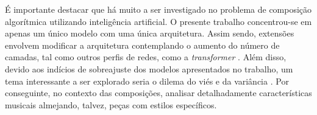 \documentclass[twoside]{automatextcc}
\begin{document}
É importante destacar que há muito a ser investigado no problema de composição algorítmica utilizando inteligência artificial. O presente trabalho concentrou-se em apenas um único modelo com uma única arquitetura. Assim sendo, extensões envolvem modificar a arquitetura contemplando o aumento do número de camadas, tal como outros perfis de redes, como a \textit{transformer} \citep{vaswani2017}. Além disso, devido aos indícios de sobreajuste dos modelos apresentados no trabalho, um tema interessante a ser explorado seria o dilema do viés e da variância \citep{geman_1992}. Por conseguinte, no contexto das composições, analisar detalhadamente características musicais almejando, talvez, peças com estilos específicos.







\end{document}

